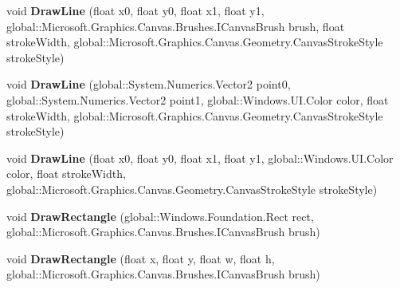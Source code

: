 \begin{DoxyCompactItemize}
\mbox{\label{interface_microsoft_1_1_graphics_1_1_canvas_1_1_i_canvas_drawing_session_a2d08811c378c0cbcef05802c8158558a}} 
void {\bfseries Draw\+Line} (float x0, float y0, float x1, float y1, global\+::\+Microsoft.\+Graphics.\+Canvas.\+Brushes.\+I\+Canvas\+Brush brush, float stroke\+Width, global\+::\+Microsoft.\+Graphics.\+Canvas.\+Geometry.\+Canvas\+Stroke\+Style stroke\+Style)
\item 
\mbox{\label{interface_microsoft_1_1_graphics_1_1_canvas_1_1_i_canvas_drawing_session_aa5127f84e2842c65de826b2860fc4f90}} 
void {\bfseries Draw\+Line} (global\+::\+System.\+Numerics.\+Vector2 point0, global\+::\+System.\+Numerics.\+Vector2 point1, global\+::\+Windows.\+U\+I.\+Color color, float stroke\+Width, global\+::\+Microsoft.\+Graphics.\+Canvas.\+Geometry.\+Canvas\+Stroke\+Style stroke\+Style)
\item 
\mbox{\label{interface_microsoft_1_1_graphics_1_1_canvas_1_1_i_canvas_drawing_session_a6dcbc5a2a7687014bbfb5e21dc5a5041}} 
void {\bfseries Draw\+Line} (float x0, float y0, float x1, float y1, global\+::\+Windows.\+U\+I.\+Color color, float stroke\+Width, global\+::\+Microsoft.\+Graphics.\+Canvas.\+Geometry.\+Canvas\+Stroke\+Style stroke\+Style)
\item 
\mbox{\label{interface_microsoft_1_1_graphics_1_1_canvas_1_1_i_canvas_drawing_session_a419ba76dbcf82a43653f83466e367260}} 
void {\bfseries Draw\+Rectangle} (global\+::\+Windows.\+Foundation.\+Rect rect, global\+::\+Microsoft.\+Graphics.\+Canvas.\+Brushes.\+I\+Canvas\+Brush brush)
\item 
\mbox{\label{interface_microsoft_1_1_graphics_1_1_canvas_1_1_i_canvas_drawing_session_ace14f3c382c98a9f991a0ebc89322afd}} 
void {\bfseries Draw\+Rectangle} (float x, float y, float w, float h, global\+::\+Microsoft.\+Graphics.\+Canvas.\+Brushes.\+I\+Canvas\+Brush brush)
\item 
\mbox{\label{interface_microsoft_1_1_graphics_1_1_canvas_1_1_i_canvas_drawing_session_aed385f9f2e3d138d11ee96a1b41e92cf}} 

\end{DoxyCompactItemize}
